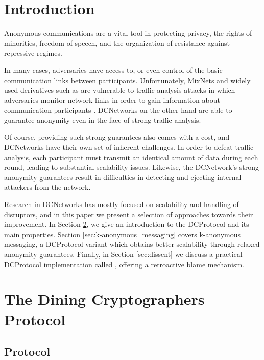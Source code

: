 \section{Introduction}

Anonymous communications are a vital tool in protecting privacy, the rights of minorities,
freedom of speech, and the organization of resistance against repressive regimes.

In many cases, adversaries have access to, or even control of the basic communication
links between participants. Unfortunately, \acp{MixNet} \cite{journals/cacm/Chaum81} and 
widely used derivatives such as \Tor \cite{conf/uss/DingledineMS04} are vulnerable to traffic
analysis attacks in which adversaries monitor network links in order to gain information
about communication participants \cite{murdoch2005low}. \acp{DCNetwork} on the other hand
are able to guarantee anonymity even in the face of strong traffic analysis.

Of course, providing such strong guarantees also comes with a cost, and \acp{DCNetwork}
have their own set of inherent challenges. In order to defeat traffic analysis,
each participant must transmit an identical amount of data during each round,
leading to substantial scalability issues. Likewise, the \ac{DCNetwork}'s strong anonymity guarantees result
in difficulties in detecting and ejecting internal attackers from the network.

Research in \acp{DCNetwork} has mostly focused on scalability and handling of disruptors,
and in this paper we present a selection of approaches towards their improvement.
In Section \ref{sec:dining_cryptographers_protocol}, we give an introduction
to the \ac{DCProtocol} and its main properties. Section \ref{sec:k-anonymous_messaging} 
covers k-anonymous messaging, a \ac{DCProtocol} variant which obtains better scalability
through relaxed anonymity guarantees. Finally, in Section \ref{sec:dissent} we discuss a practical
\ac{DCProtocol} implementation called \Dissent, offering a retroactive blame mechanism.

\section{The Dining Cryptographers Protocol} \label{sec:dining_cryptographers_protocol}


\subsection{Protocol}

